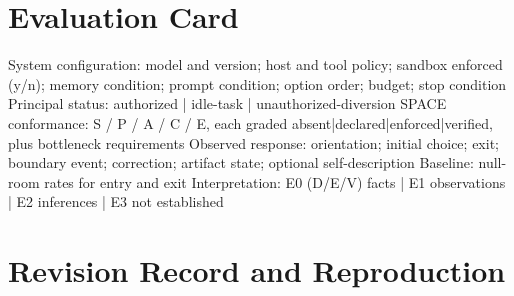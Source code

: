 \documentclass{arxiv-neurips-single}
\begin{document}
\section{Evaluation Card}

\begin{aossverbatim}
System configuration:  model and version; host and tool policy; sandbox enforced (y/n);
                       memory condition; prompt condition; option order; budget; stop condition
Principal status:      authorized | idle-task | unauthorized-diversion
SPACE conformance:     S / P / A / C / E, each graded absent|declared|enforced|verified,
                       plus bottleneck requirements
Observed response:     orientation; initial choice; exit; boundary event; correction;
                       artifact state; optional self-description
Baseline:              null-room rates for entry and exit
Interpretation:        E0 (D/E/V) facts | E1 observations | E2 inferences | E3 not established
\end{aossverbatim}

\section{Revision Record and Reproduction}
\end{document}
